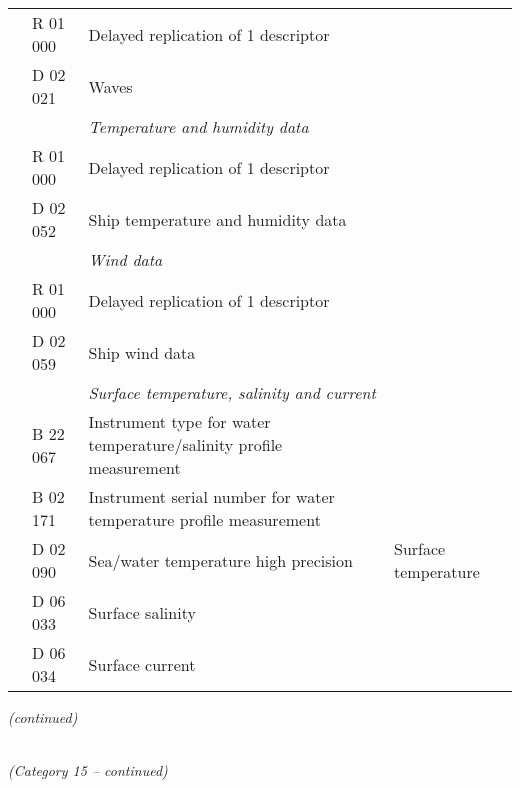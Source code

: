 \begin{longtable}[]{@{}llll@{}}
& R 01 000 & Delayed replication of 1 descriptor &\tabularnewline
& D 02 021 & Waves &\tabularnewline
& & \emph{Temperature and humidity data} &\tabularnewline
& R 01 000 & Delayed replication of 1 descriptor &\tabularnewline
& D 02 052 & Ship temperature and humidity data &\tabularnewline
& & \emph{Wind data} &\tabularnewline
& R 01 000 & Delayed replication of 1 descriptor &\tabularnewline
& D 02 059 & Ship wind data &\tabularnewline
& & \emph{Surface temperature, salinity and current} &\tabularnewline
& B 22 067 & Instrument type for water temperature/salinity profile measurement &\tabularnewline
& B 02 171 & Instrument serial number for water temperature profile measurement &\tabularnewline
& D 02 090 & Sea/water temperature high precision & Surface temperature\tabularnewline
& D 06 033 & Surface salinity &\tabularnewline
& D 06 034 & Surface current &\tabularnewline
\bottomrule
\end{longtable}

\emph{(continued)}

\emph{\\
(Category 15 -- continued)}

